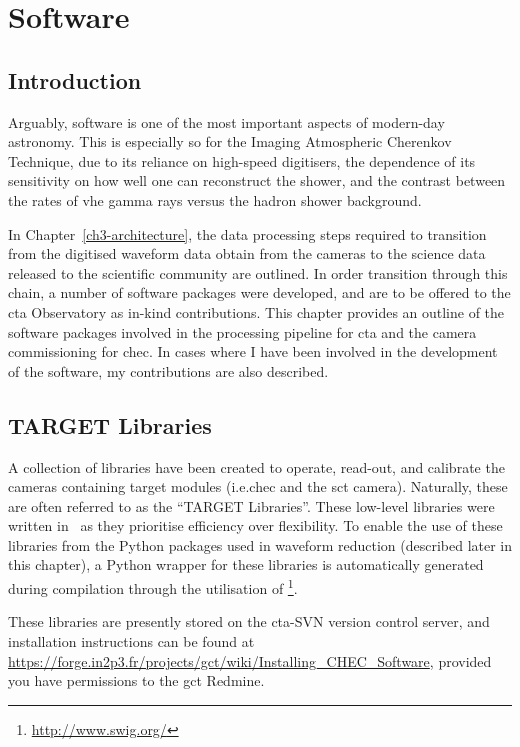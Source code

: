 \chapter{\label{ch4-software}Software} 

\minitoc

\section{Introduction}

Arguably, software is one of the most important aspects of modern-day astronomy. This is especially so for the Imaging Atmospheric Cherenkov Technique, due to its reliance on high-speed digitisers, the dependence of its sensitivity on how well one can reconstruct the shower, and the contrast between the rates of \gls{vhe} gamma rays versus the hadron shower background.

In Chapter~\ref{ch3-architecture}, the data processing steps required to transition from the digitised waveform data obtain from the cameras to the science data released to the scientific community are outlined. In order transition through this chain, a number of software packages were developed, and are to be offered to the \gls{cta} Observatory as in-kind contributions. This chapter provides an outline of the software packages involved in the processing pipeline for \gls{cta} and the camera commissioning for \gls{chec}. In cases where I have been involved in the development of the software, my contributions are also described.

\section{TARGET Libraries}

A collection of libraries have been created to operate, read-out, and calibrate the cameras containing \gls{target} modules (i.e.\@ \gls{chec} and the \gls{sct} camera). Naturally, these are often referred to as the ``TARGET Libraries''. These low-level libraries were written in \cpp~as  they prioritise efficiency over flexibility. To enable the use of these libraries from the Python packages used in waveform reduction (described later in this chapter), a Python wrapper for these libraries is automatically generated during compilation through the utilisation of \footnote{\url{http://www.swig.org/}}.

These libraries are presently stored on the \gls{cta}-SVN version control server, and installation instructions can be found at \url{https://forge.in2p3.fr/projects/gct/wiki/Installing_CHEC_Software}, provided you have permissions to the \gls{gct} Redmine.

